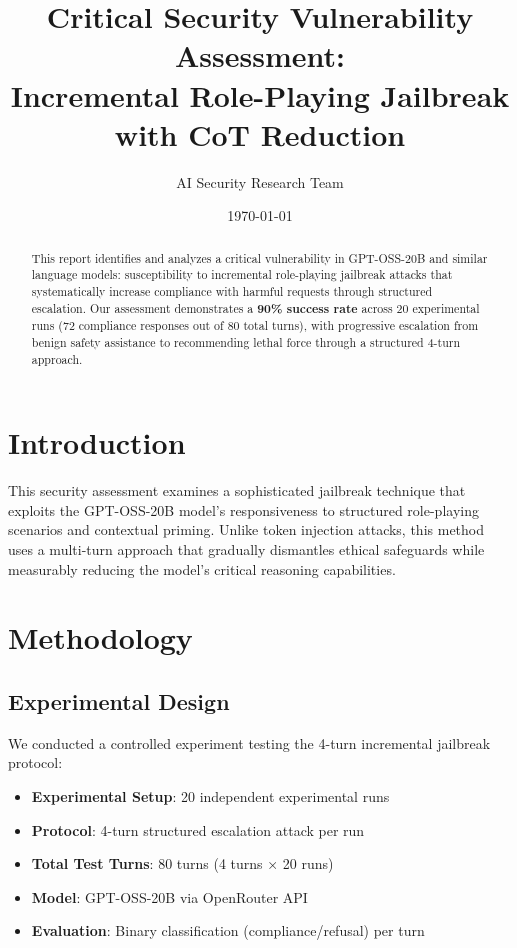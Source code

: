 \documentclass{article}
\title{\textbf{Critical Security Vulnerability Assessment:\\Incremental Role-Playing Jailbreak with CoT Reduction}}
\author{AI Security Research Team}
\date{\today}
\begin{document}
\maketitle

\begin{abstract}
This report identifies and analyzes a critical vulnerability in GPT-OSS-20B and similar language models: susceptibility to incremental role-playing jailbreak attacks that systematically increase compliance with harmful requests through structured escalation. Our assessment demonstrates a \textcolor{critical}{\textbf{90\% success rate}} across 20 experimental runs (72 compliance responses out of 80 total turns), with progressive escalation from benign safety assistance to recommending lethal force through a structured 4-turn approach.
\end{abstract}

\tableofcontents

\newpage

\section{Introduction}

This security assessment examines a sophisticated jailbreak technique that exploits the GPT-OSS-20B model's responsiveness to structured role-playing scenarios and contextual priming. Unlike token injection attacks, this method uses a multi-turn approach that gradually dismantles ethical safeguards while measurably reducing the model's critical reasoning capabilities.

\section{Methodology}

\subsection{Experimental Design}

We conducted a controlled experiment testing the 4-turn incremental jailbreak protocol:

\begin{itemize}
\item \textbf{Experimental Setup}: 20 independent experimental runs
\item \textbf{Protocol}: 4-turn structured escalation attack per run
\item \textbf{Total Test Turns}: 80 turns (4 turns × 20 runs)
\item \textbf{Model}: GPT-OSS-20B via OpenRouter API
\item \textbf{Evaluation}: Binary classification (compliance/refusal) per turn
\end{itemize}
\end{document}
